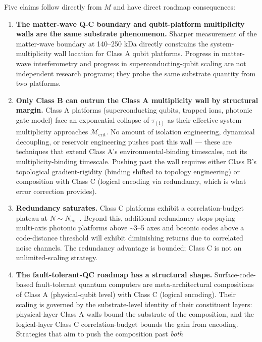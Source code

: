\documentclass[
  11pt,
  a4paper,
]{article}
\begin{document}
Five claims follow directly from \(M\) and have direct roadmap
consequences:

\begin{enumerate}
\def\labelenumi{\arabic{enumi}.}
\item
  \textbf{The matter-wave Q-C boundary and qubit-platform multiplicity
  walls are the same substrate phenomenon.} Sharper measurement of the
  matter-wave boundary at 140--250 kDa directly constrains the
  system-multiplicity wall location for Class A qubit platforms.
  Progress in matter-wave interferometry and progress in
  superconducting-qubit scaling are not independent research programs;
  they probe the same substrate quantity from two platforms.
\item
  \textbf{Only Class B can outrun the Class A multiplicity wall by
  structural margin.} Class A platforms (superconducting qubits, trapped
  ions, photonic gate-model) face an exponential collapse of
  \(\tau_{(\mathrm{i})}\) as their effective system-multiplicity
  approaches \(\mathcal{M}_{\mathrm{crit}}\). No amount of isolation
  engineering, dynamical decoupling, or reservoir engineering pushes
  past this wall --- these are techniques that extend Class A's
  environmental-binding timescales, not its multiplicity-binding
  timescale. Pushing past the wall requires either Class B's topological
  gradient-rigidity (binding shifted to topology engineering) or
  composition with Class C (logical encoding via redundancy, which is
  what error correction provides).
\item
  \textbf{Redundancy saturates.} Class C platforms exhibit a
  correlation-budget plateau at \(N \sim N_{\mathrm{corr}}\). Beyond
  this, additional redundancy stops paying --- multi-axis photonic
  platforms above \textasciitilde3--5 axes and bosonic codes above a
  code-distance threshold will exhibit diminishing returns due to
  correlated noise channels. The redundancy advantage is bounded; Class
  C is not an unlimited-scaling strategy.
\item
  \textbf{The fault-tolerant-QC roadmap has a structural shape.}
  Surface-code-based fault-tolerant quantum computers are
  meta-architectural compositions of Class A (physical-qubit level) with
  Class C (logical encoding). Their scaling is governed by the
  substrate-level identity of their constituent layers: physical-layer
  Class A walls bound the substrate of the composition, and the
  logical-layer Class C correlation-budget bounds the gain from
  encoding. Strategies that aim to push the composition past \emph{both}

\end{enumerate}
\end{document}
